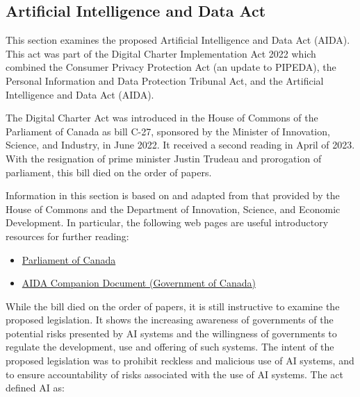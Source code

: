 \begin{advanced}
\section{Artificial Intelligence and Data Act}

This section examines the proposed Artificial Intelligence and Data Act (AIDA). This act was part of the Digital Charter Implementation Act 2022 which combined the Consumer Privacy Protection Act (an update to PIPEDA), the Personal Information and Data Protection Tribunal Act, and the Artificial Intelligence and Data Act (AIDA). 

\begin{infobox}
The Digital Charter Act was introduced in the House of Commons of the Parliament of Canada as bill C-27, sponsored by the Minister of Innovation, Science, and Industry, in June 2022. It received a second reading in April of 2023. With the resignation of prime minister Justin Trudeau and prorogation of parliament, this bill died on the order of papers. \end{infobox}

\begin{resourcebox}

Information in this section is based on and adapted from that provided by the House of Commons and the Department of Innovation, Science, and Economic Development. In particular, the following web pages are useful introductory resources for further reading:
\begin{itemize}
\item \href{https://www.parl.ca/legisinfo/en/bill/44-1/c-27}{Parliament of Canada}
\item \href{https://ised-isde.canada.ca/site/innovation-better-canada/en/artificial-intelligence-and-data-act-aida-companion-document}{AIDA Companion Document (Government of Canada)}
\end{itemize}
\end{resourcebox}

While the bill died on the order of papers, it is still instructive to examine the proposed legislation. It shows the increasing awareness of governments of the potential risks presented by AI systems and the willingness of governments to regulate the development, use and offering of such systems. The intent of the proposed legislation was to prohibit reckless and malicious use of AI systems, and to ensure accountability of risks associated with the use of AI systems. The act defined AI as:


\end{advanced}
